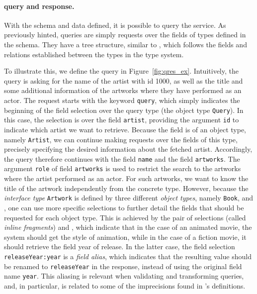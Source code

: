 

\paragraph{\gql query and response.}

With the schema and data defined, it is possible to query the service. 
As previously hinted, \gql queries are simply requests over the fields of types defined in the schema.
They have a tree structure, similar to \json, which follows the fields and relations established between the types
in the type system.

To illustrate this, we define the query in
Figure~\ref{fig:qres_ex}. Intuitively, the query is asking for the
name of the artist with id 1000, as well as the title and some
additional information of the artworks where they have performed as an
actor.  The request starts with the keyword \texttt{query}, which
simply indicates the beginning of the field selection over the query
type (the object type \texttt{Query}).   In this case, the selection is over the field
\texttt{artist}, providing the argument \texttt{id} to indicate which
artist we want to retrieve.  Because the field is of an object type,
namely \texttt{Artist}, we can continue making requests over the
fields of this type, precisely specifying the desired information
about the fetched artist. Accordingly, the query
therefore continues with the field \texttt{name} and the field
\texttt{artworks}. The argument \texttt{role} of field \texttt{artworks} is used to restrict the
search to the artworks where the artist performed as an actor.
For such artworks, we want to know the title of the artwork
independently from the concrete type. However, because the {\em
  interface type} \texttt{Artwork} is defined by three different {\em
  object types}, namely \texttt{Book}, \fiction and \animation, one
can use more specific selections to further detail the fields that
should be requested for each object type.  This is achieved by the
pair of selections (called {\em inline fragments})
 and , which indicate that in the case of an
animated movie, the system should get the style of animation, while in
the case of a fiction movie, it should retrieve the field year of
release. In the latter case, the field selection
\texttt{releaseYear:year} is a {\em field alias}, which indicates that
the resulting value should be renamed to \texttt{releaseYear} in the
response, instead of using the original field name \texttt{year}.
This aliasing is relevant when validating and transforming queries,
and, in particular, is related to some of the imprecisions found in
\HP's definitions.


